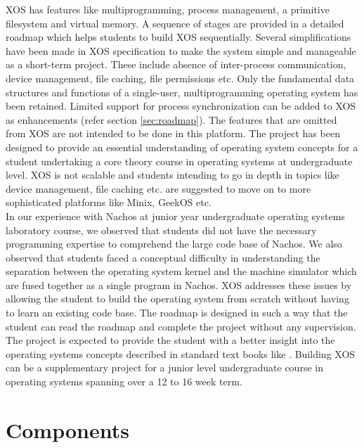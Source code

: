 \documentclass[10pt]{report}
\begin{document}
XOS has features like multiprogramming, process management, a primitive  filesystem and virtual memory. A sequence of stages are provided in a detailed roadmap which helps students to build XOS sequentially. Several simplifications have been made in XOS specification to make the system simple and manageable as a short-term project. These include absence of inter-process communication, device management, file caching, file permissions etc.  Only the fundamental data structures and functions of a single-user, multiprogramming operating system has been retained. Limited support for process synchronization can be added to XOS as enhancements (refer section \ref{sec:roadmap}). The features that are omitted from XOS are not intended to be done in this platform. The project has been designed to provide an essential understanding of operating system concepts for a student undertaking a core theory course in  operating systems at undergraduate level. XOS is not scalable and students intending to go in depth in topics like device management, file caching etc. are suggested to move on to more sophisticated platforms like Minix, GeekOS\cite{survey} etc. \\

In our experience with Nachos at junior year undergraduate operating systems laboratory course, we observed that students did not have the necessary programming expertise to comprehend the large code base of Nachos.  We also observed that students faced a conceptual difficulty in understanding the separation between the operating system kernel and the machine simulator which are fused together as a single program in Nachos. XOS addresses these issues by allowing the student to build the operating system from scratch without having to learn an existing code base. The roadmap is designed in such a way that the student can read the roadmap and complete the project without any supervision. The project is expected to provide the student with a better insight into the operating systems concepts described in standard text books like \cite{silberschatz}. Building XOS can be a supplementary project for a junior level undergraduate course in operating systems spanning over a 12 to 16 week term. \\




\chapter{Components}
\end{document}
